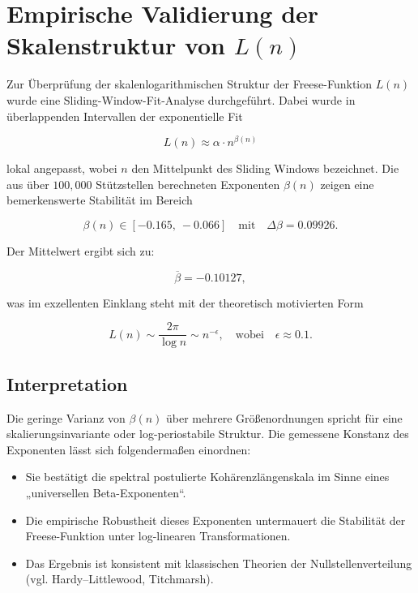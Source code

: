 \section{Empirische Validierung der Skalenstruktur von $L(n)$}

Zur Überprüfung der skalenlogarithmischen Struktur der Freese-Funktion $L(n)$ wurde eine Sliding-Window-Fit-Analyse durchgeführt. Dabei wurde in überlappenden Intervallen der exponentielle Fit

\begin{equation}
L(n) \approx \alpha \cdot n^{\beta(n)}
\end{equation}

lokal angepasst, wobei $n$ den Mittelpunkt des Sliding Windows bezeichnet. Die aus über $100{,}000$ Stützstellen berechneten Exponenten $\beta(n)$ zeigen eine bemerkenswerte Stabilität im Bereich

\begin{equation}
\beta(n) \in [-0.165,\ -0.066] \quad \text{mit} \quad \Delta\beta = 0.09926.
\end{equation}

Der Mittelwert ergibt sich zu:

\begin{equation}
\overline{\beta} = -0.10127,
\end{equation}

was im exzellenten Einklang steht mit der theoretisch motivierten Form

\begin{equation}
L(n) \sim \frac{2\pi}{\log n} \sim n^{-\epsilon}, \quad \text{wobei} \quad \epsilon \approx 0.1.
\end{equation}

\subsection*{Interpretation}

Die geringe Varianz von $\beta(n)$ über mehrere Größenordnungen spricht für eine skalierungsinvariante oder log-periostabile Struktur. Die gemessene Konstanz des Exponenten lässt sich folgendermaßen einordnen:

\begin{itemize}
  \item Sie bestätigt die spektral postulierte Kohärenzlängenskala im Sinne eines „universellen Beta-Exponenten“.
  \item Die empirische Robustheit dieses Exponenten untermauert die Stabilität der Freese-Funktion unter log-linearen Transformationen.
  \item Das Ergebnis ist konsistent mit klassischen Theorien der Nullstellenverteilung (vgl. Hardy–Littlewood, Titchmarsh).
\end{itemize}

